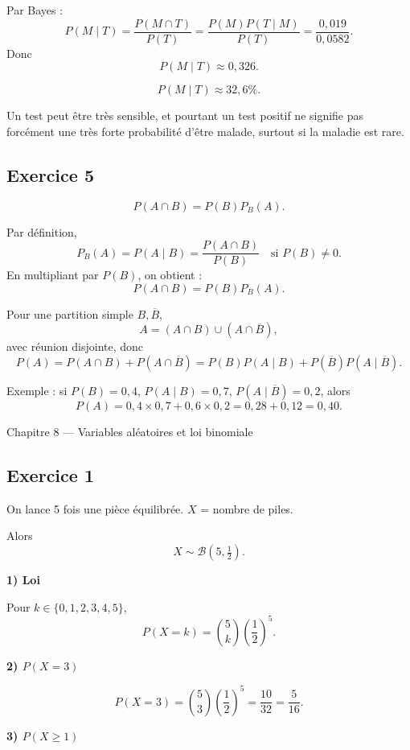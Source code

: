 \documentclass[11pt,a4paper]{article}
\begin{document}
Par Bayes :
\[
P(M\mid T)=\frac{P(M\cap T)}{P(T)}
=\frac{P(M)P(T\mid M)}{P(T)}
=\frac{0{,}019}{0{,}0582}.
\]
Donc
\[
P(M\mid T)\approx 0{,}326.
\]

\[
\boxed{P(M\mid T)\approx 32{,}6\%.}
\]

\begin{logiquebox}
Un test peut être très sensible, et pourtant un test positif ne signifie pas forcément une très forte probabilité d'être malade, surtout si la maladie est rare.
\end{logiquebox}

\subsection*{Exercice 5}
\[
P(A\cap B)=P(B)P_B(A).
\]

Par définition,
\[
P_B(A)=P(A\mid B)=\frac{P(A\cap B)}{P(B)} \quad \text{si } P(B)\neq 0.
\]
En multipliant par \(P(B)\), on obtient :
\[
\boxed{P(A\cap B)=P(B)P_B(A).}
\]

Pour une partition simple \(B,\overline B\),
\[
A=(A\cap B)\cup (A\cap \overline B),
\]
avec réunion disjointe, donc
\[
P(A)=P(A\cap B)+P(A\cap \overline B)
=P(B)P(A\mid B)+P(\overline B)P(A\mid \overline B).
\]

Exemple : si \(P(B)=0{,}4\), \(P(A\mid B)=0{,}7\), \(P(A\mid \overline B)=0{,}2\), alors
\[
P(A)=0{,}4\times 0{,}7+0{,}6\times 0{,}2=0{,}28+0{,}12=0{,}40.
\]

\begin{chapitrebox}{Chapitre 8 --- Variables aléatoires et loi binomiale}
\end{chapitrebox}

\subsection*{Exercice 1}
On lance 5 fois une pièce équilibrée. \(X\) = nombre de piles.

Alors
\[
X\sim \mathcal{B}(5,\tfrac12).
\]

\textbf{1) Loi}

Pour \(k\in\{0,1,2,3,4,5\}\),
\[
P(X=k)=\binom{5}{k}\left(\frac12\right)^5.
\]

\textbf{2) \(P(X=3)\)}

\[
P(X=3)=\binom53\left(\frac12\right)^5=\frac{10}{32}=\frac{5}{16}.
\]

\textbf{3) \(P(X\geq 1)\)}
\end{document}
